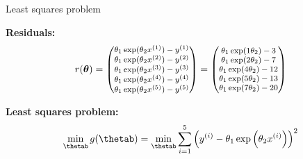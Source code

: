 \documentclass[11pt,compress,t,notes=noshow, xcolor=table]{beamer}
\begin{document}
\begin{vbframe}{Least squares problem}

\textbf{Residuals:}
\begin{equation*}
    \footnotesize
    r(\bm{\theta}) = \begin{pmatrix} 
        \theta_1 \exp(\theta_2 x^{(1)}) - y^{(1)} \\
        \theta_1 \exp(\theta_2 x^{(2)}) - y^{(2)} \\
        \theta_1 \exp(\theta_2 x^{(3)}) - y^{(3)} \\
        \theta_1 \exp(\theta_2 x^{(4)}) - y^{(4)} \\
        \theta_1 \exp(\theta_2 x^{(5)}) - y^{(5)}
     \end{pmatrix} = \begin{pmatrix} 
        \theta_1 \exp(1 \theta_2) - 3 \\
        \theta_1 \exp(2 \theta_2) - 7 \\
        \theta_1 \exp(4 \theta_2) - 12 \\
        \theta_1 \exp(5 \theta_2) - 13 \\
        \theta_1 \exp(7 \theta_2) - 20
     \end{pmatrix}
\end{equation*}

\textbf{Least squares problem:}
\begin{equation*}
    \min_{\thetab} g(\thetab) = \min_{\thetab} \sum_{i=1}^{5} \left(\yi - \theta_1 \exp\left(\theta_2 x^{(i)}\right)\right)^2
\end{equation*}

\end{vbframe}
\end{document}
